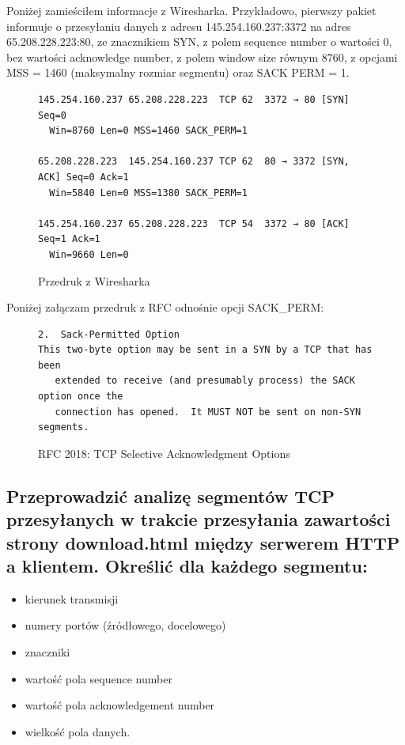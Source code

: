 \documentclass[polish, a4paper]{article}
\begin{document}
Poniżej zamieściłem informacje z Wiresharka. Przykładowo, pierwszy pakiet informuje o przesyłaniu danych z adresu 145.254.160.237:3372 na adres 65.208.228.223:80, ze znacznikiem SYN, z polem sequence number o wartości 0, bez wartości acknowledge number, z polem window size równym 8760, z opcjami MSS = 1460  (maksymalny rozmiar segmentu) oraz SACK PERM = 1.

\begin{figure}[H]
\begin{verbatim}
145.254.160.237	65.208.228.223	TCP	62	3372 → 80 [SYN] Seq=0 
  Win=8760 Len=0 MSS=1460 SACK_PERM=1
  
65.208.228.223	145.254.160.237	TCP	62	80 → 3372 [SYN, ACK] Seq=0 Ack=1 
  Win=5840 Len=0 MSS=1380 SACK_PERM=1
  
145.254.160.237	65.208.228.223	TCP	54	3372 → 80 [ACK] Seq=1 Ack=1 
  Win=9660 Len=0
\end{verbatim}
\caption{Przedruk z Wiresharka}
\end{figure}

Poniżej załączam przedruk z RFC odnośnie opcji SACK\_PERM:

\begin{figure}[H]
\begin{verbatim}
2.  Sack-Permitted Option
This two-byte option may be sent in a SYN by a TCP that has been
   extended to receive (and presumably process) the SACK option once the
   connection has opened.  It MUST NOT be sent on non-SYN segments.

\end{verbatim}
\caption{RFC 2018: TCP Selective Acknowledgment Options}
\end{figure}


\subsection{
Przeprowadzić analizę segmentów TCP przesyłanych w trakcie przesyłania zawartości
strony download.html między serwerem HTTP a klientem. Określić dla każdego segmentu:
}
\begin{itemize}
\item{kierunek transmisji}
\item{numery portów (źródłowego, docelowego)}
\item{znaczniki}
\item{wartość pola sequence number}
\item{wartość pola acknowledgement number}
\item{wielkość pola danych.}
\end{itemize}
\end{document}
